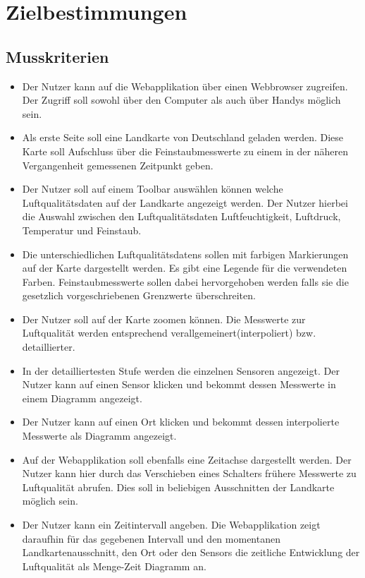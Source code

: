 \section{Zielbestimmungen}
\subsection{Musskriterien}
 \begin{itemize}
	\item Der Nutzer kann auf die Webapplikation über einen Webbrowser zugreifen. 
	Der Zugriff soll sowohl über den Computer als auch über Handys möglich sein.
	\item Als erste Seite soll eine Landkarte von Deutschland geladen werden.
	Diese Karte soll Aufschluss über die Feinstaubmesswerte zu einem in der näheren Vergangenheit gemessenen Zeitpunkt geben.
	\item Der Nutzer soll auf einem Toolbar auswählen können welche Luftqualitätsdaten auf der Landkarte angezeigt werden. 
	Der Nutzer hierbei die Auswahl zwischen den Luftqualitätsdaten Luftfeuchtigkeit, Luftdruck, Temperatur und Feinstaub.
	\item Die unterschiedlichen \glspl{Luftqualitätsdaten} sollen mit farbigen Markierungen auf der Karte dargestellt werden. 
	Es gibt eine Legende für die verwendeten Farben.
	Feinstaubmesswerte sollen dabei hervorgehoben werden falls sie die gesetzlich vorgeschriebenen Grenzwerte überschreiten.
	\item Der Nutzer soll auf der Karte zoomen können. 
	Die Messwerte zur Luftqualität werden entsprechend verallgemeinert(interpoliert) bzw. detaillierter.
	\item In der detailliertesten Stufe werden die einzelnen Sensoren angezeigt. 
	Der Nutzer kann auf einen Sensor klicken und bekommt dessen Messwerte in einem Diagramm angezeigt.
	\item Der Nutzer kann auf einen Ort klicken und bekommt dessen interpolierte Messwerte als Diagramm angezeigt.
	\item Auf der Webapplikation soll ebenfalls eine Zeitachse dargestellt werden. 
	Der Nutzer kann hier durch das Verschieben eines Schalters frühere Messwerte zu Luftqualität abrufen. 
	Dies soll in beliebigen Ausschnitten der Landkarte möglich sein.
	\item Der Nutzer kann ein Zeitintervall angeben. Die Webapplikation zeigt daraufhin für das gegebenen Intervall 
	und den momentanen Landkartenausschnitt, den Ort oder den \glspl{Sensor} die zeitliche Entwicklung der Luftqualität als Menge-Zeit Diagramm an.

\end{itemize}
